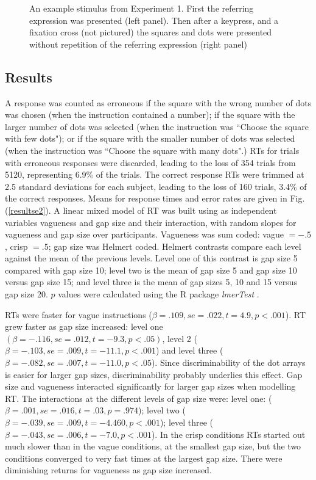 \documentclass[
a4paper 
, doc
, longtable
]{apa6}
\begin{document}
\begin{figure}[tbp]
\caption{An example stimulus from Experiment 1. First the referring expression was presented (left panel). Then after a keypress, and a fixation cross (not pictured) the squares and dots were presented without repetition of the referring expression (right panel)}
\label{stimuluse1}
\end{figure}

\subsection{Results}

A response was counted as erroneous if the square with the wrong number of dots was chosen (when the instruction contained a number); if the square with the larger number of dots was selected (when the instruction was ``Choose the square with few dots"); or if the square with the smaller number of dots was selected (when the instruction was ``Choose the square with many dots".) %
RTs for trials with erroneous responses were discarded, leading to the loss of 354 trials from 5120, representing 6.9\% of the trials. The correct response RTs were trimmed at 2.5 standard deviations for each subject, leading to the loss of 160 trials, 3.4\% of the correct responses. Means for response times and error rates are given in Fig. (\ref{resultse2}).
A linear mixed model of RT was built using as independent variables vagueness and gap size and their interaction, with random slopes for vagueness and gap size over participants. Vagueness was sum coded: vague $= -.5$, crisp $= .5$; gap size was Helmert coded. Helmert contrasts compare each level against the mean of the previous levels. Level one of this contrast is gap size 5 compared with gap size 10; level two is the mean of gap size 5 and gap size 10 versus gap size 15; and level three is the mean of gap sizes 5, 10 and 15 versus gap size 20. 
$p$ values were calculated using the R package \emph{lmerTest} \cite{lmerTest}.

RTs were faster for vague instructions ($\beta=.109, se=.022, t=4.9, p<.001$). 
%
RT grew faster as gap size increased: level one $(\beta=-.116, se=.012, t=-9.3, p<.05)$, level 2 ($\beta=-.103, se=.009, t=-11.1, p<.001$) and level three ($\beta=-.082, se=.007, t=-11.0, p<.05$). Since discriminability of the dot arrays is easier for larger gap sizes, discriminability probably underlies this effect. Gap size and vagueness interacted significantly for larger gap sizes when modelling RT. %
The interactions at the different levels of gap size were: level one: ($\beta=.001, se=.016, t=.03, p=.974$); level two ($\beta=-.039, se=.009, t=-4.460, p<.001$); level three ($\beta=-.043, se=.006,t=-7.0, p<.001$). In the crisp conditions RTs started out much slower than in the vague conditions, at the smallest gap size, but the two conditions converged to very fast times at the largest gap size. There were diminishing returns for vagueness as gap size increased. 
\end{document}
